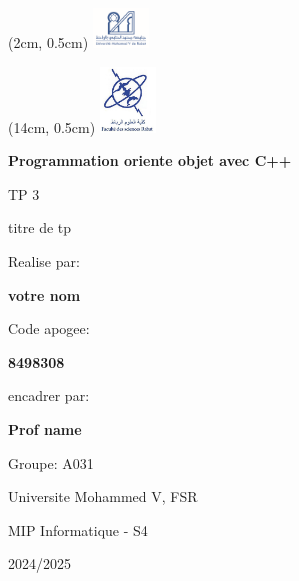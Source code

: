 \begin{titlepage}
    \begin{textblock*}{2cm}(2cm, 0.5cm) %
        \includegraphics[width=1.5cm]{figures/umv_logo.png}
    \end{textblock*}
    
    \begin{textblock*}{2cm}(14cm, 0.5cm) %
        \includegraphics[width=1.5cm]{figures/Logo_FSR.jpg}
    \end{textblock*}

    \begin{center}
        

        \vspace*{3cm}

        \Huge
        \textbf{Programmation oriente objet avec C++}

        \Large
        \vspace{0.5cm}
	\hspace{0.5cm}TP 3 

	titre de tp

        \vspace{1.5cm}
        Realise par:

        \textbf{votre nom}

	\vspace{1.5cm}
        Code apogee: 

        \textbf{8498308}

        \vspace{1.5cm}
        encadrer par: 
        
        \textbf{Prof name}

        Groupe: A031

        \vfill
        \large
        Universite Mohammed V, FSR

        MIP Informatique - S4

        2024/2025

        \vspace{.8cm}




    \end{center}
\end{titlepage}
